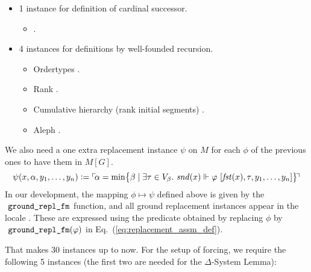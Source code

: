 \begin{itemize}
\begin{itemize}
  \end{itemize}
\item 1 instance for definition of cardinal successor.
  \begin{itemize}
  \item
    .
  \end{itemize}
\item
  4 instances for definitions by well-founded recursion.
  \begin{itemize}
  \item Ordertypes
    .
  \item Rank .
  \item Cumulative hierarchy (rank initial segments) .
  \item Aleph .
  \end{itemize}
\end{itemize}

We also need a one extra replacement instance $\psi$ on $M$ for each
$\phi$ of the
previous ones to have them in $M[G]$.
\[
  \psi(x,\alpha,y_1,\dots,y_n) \mathrel{\mathop:}= \ulcorner{\!\alpha = \min \bigl\{
    \beta \mid \exists\tau\in V_\beta.\  \mathit{snd}(x) \Vdash\varphi\ [\mathit{fst}(x),\tau,y_1,\dots,y_n]\bigr\}\!}\urcorner
\]
In our development, the mapping $\phi\mapsto\psi$ defined above is given by the
$\isatt{ground{\uscore}repl{\uscore}fm}$ function, and all ground replacement
instances appear in the locale . These are expressed using
the  predicate
obtained by replacing $\phi$ by
$\isatt{ground{\uscore}repl{\uscore}fm}(\phi)$ in Eq.~(\ref{eq:replacement_assm_def}).

That makes 30 instances up to now. For the setup of forcing, we
require the following 5 instances (the first two are needed for the $\Delta$-System Lemma):

